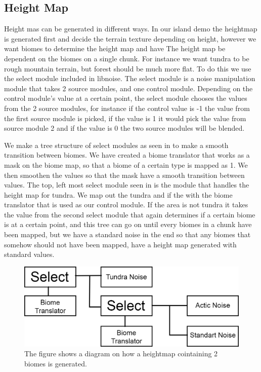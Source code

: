\subsection{Height Map}

Height mas can be generated in different ways. In our island demo the heightmap is generated first and decide the terrain texture depending on height, however we want biomes to determine the height map and have The height map be dependent on the biomes on a single chunk. For instance we want tundra to be rough mountain terrain, but forest should be much more flat. To do this we use the select module included in libnoise. The select module is a noise manipulation module that takes 2 source modules, and one control module. Depending on the control module's value at a certain point, the select module chooses the values from the 2 source modules, for instance if the control value is -1 the value from the first source module is picked, if the value is 1 it would pick the value from source module 2 and if the value is 0 the two source modules will be blended.

We make a tree structure of select modules as seen in  to make a smooth transition between biomes. We have created a biome translator that works as a mask on the biome map, so that a biome of a certain type is mapped as 1. We then smoothen the values so that the mask have a smooth transition between values. The top, left most select module seen in  is the module that handles the height map for tundra. We map out the tundra and if the with the biome translator that is used as our control module. If the area is not tundra it takes the value from the second select module that again determines if a certain biome is at a certain point, and this tree can go on until every biomes in a chunk have been mapped, but we have a standard noise in the end so that any biomes that somehow should not have been mapped, have a height map generated with standard values.

\begin{figure}[H]
	\includegraphics[width=1\linewidth]{img/HeightMap}
	\centering
	\caption{The figure shows a diagram on how a heightmap cointaining 2 biomes is generated.}
	\label{fig:heightmap}
\end{figure}

